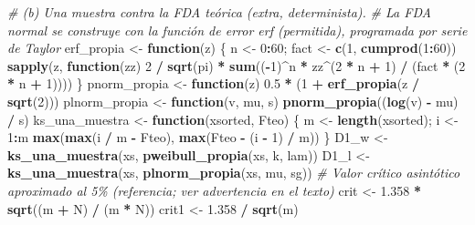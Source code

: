\documentclass[
  spanish,
]{article}
\newenvironment{Shaded}{\begin{snugshade}}{\end{snugshade}}
\newcommand{\CommentTok}[1]{\textcolor[rgb]{0.56,0.35,0.01}{\textit{#1}}}
\newcommand{\ControlFlowTok}[1]{\textcolor[rgb]{0.13,0.29,0.53}{\textbf{#1}}}
\newcommand{\DecValTok}[1]{\textcolor[rgb]{0.00,0.00,0.81}{#1}}
\newcommand{\FloatTok}[1]{\textcolor[rgb]{0.00,0.00,0.81}{#1}}
\newcommand{\FunctionTok}[1]{\textcolor[rgb]{0.13,0.29,0.53}{\textbf{#1}}}
\newcommand{\NormalTok}[1]{#1}
\newcommand{\OtherTok}[1]{\textcolor[rgb]{0.56,0.35,0.01}{#1}}
\newcommand{\SpecialCharTok}[1]{\textcolor[rgb]{0.81,0.36,0.00}{\textbf{#1}}}
\begin{document}
\begin{Shaded}
\begin{Highlighting}[]
\CommentTok{\# (b) Una muestra contra la FDA teórica (extra, determinista).}
\CommentTok{\#     La FDA normal se construye con la función de error erf (permitida), programada por serie de Taylor}
\NormalTok{erf\_propia }\OtherTok{\textless{}{-}} \ControlFlowTok{function}\NormalTok{(z) \{}
\NormalTok{  n }\OtherTok{\textless{}{-}} \DecValTok{0}\SpecialCharTok{:}\DecValTok{60}\NormalTok{; fact }\OtherTok{\textless{}{-}} \FunctionTok{c}\NormalTok{(}\DecValTok{1}\NormalTok{, }\FunctionTok{cumprod}\NormalTok{(}\DecValTok{1}\SpecialCharTok{:}\DecValTok{60}\NormalTok{))}
  \FunctionTok{sapply}\NormalTok{(z, }\ControlFlowTok{function}\NormalTok{(zz) }\DecValTok{2} \SpecialCharTok{/} \FunctionTok{sqrt}\NormalTok{(pi) }\SpecialCharTok{*} \FunctionTok{sum}\NormalTok{((}\SpecialCharTok{{-}}\DecValTok{1}\NormalTok{)}\SpecialCharTok{\^{}}\NormalTok{n }\SpecialCharTok{*}\NormalTok{ zz}\SpecialCharTok{\^{}}\NormalTok{(}\DecValTok{2} \SpecialCharTok{*}\NormalTok{ n }\SpecialCharTok{+} \DecValTok{1}\NormalTok{) }\SpecialCharTok{/}\NormalTok{ (fact }\SpecialCharTok{*}\NormalTok{ (}\DecValTok{2} \SpecialCharTok{*}\NormalTok{ n }\SpecialCharTok{+} \DecValTok{1}\NormalTok{))))}
\NormalTok{\}}
\NormalTok{pnorm\_propia  }\OtherTok{\textless{}{-}} \ControlFlowTok{function}\NormalTok{(z) }\FloatTok{0.5} \SpecialCharTok{*}\NormalTok{ (}\DecValTok{1} \SpecialCharTok{+} \FunctionTok{erf\_propia}\NormalTok{(z }\SpecialCharTok{/} \FunctionTok{sqrt}\NormalTok{(}\DecValTok{2}\NormalTok{)))}
\NormalTok{plnorm\_propia }\OtherTok{\textless{}{-}} \ControlFlowTok{function}\NormalTok{(v, mu, s) }\FunctionTok{pnorm\_propia}\NormalTok{((}\FunctionTok{log}\NormalTok{(v) }\SpecialCharTok{{-}}\NormalTok{ mu) }\SpecialCharTok{/}\NormalTok{ s)}
\NormalTok{ks\_una\_muestra }\OtherTok{\textless{}{-}} \ControlFlowTok{function}\NormalTok{(xsorted, Fteo) \{}
\NormalTok{  m }\OtherTok{\textless{}{-}} \FunctionTok{length}\NormalTok{(xsorted); i }\OtherTok{\textless{}{-}} \DecValTok{1}\SpecialCharTok{:}\NormalTok{m}
  \FunctionTok{max}\NormalTok{(}\FunctionTok{max}\NormalTok{(i }\SpecialCharTok{/}\NormalTok{ m }\SpecialCharTok{{-}}\NormalTok{ Fteo), }\FunctionTok{max}\NormalTok{(Fteo }\SpecialCharTok{{-}}\NormalTok{ (i }\SpecialCharTok{{-}} \DecValTok{1}\NormalTok{) }\SpecialCharTok{/}\NormalTok{ m))}
\NormalTok{\}}
\NormalTok{D1\_w }\OtherTok{\textless{}{-}} \FunctionTok{ks\_una\_muestra}\NormalTok{(xs, }\FunctionTok{pweibull\_propia}\NormalTok{(xs, k, lam))}
\NormalTok{D1\_l }\OtherTok{\textless{}{-}} \FunctionTok{ks\_una\_muestra}\NormalTok{(xs, }\FunctionTok{plnorm\_propia}\NormalTok{(xs, mu, sg))}
\CommentTok{\# Valor crítico asintótico aproximado al 5\% (referencia; ver advertencia en el texto)}
\NormalTok{crit }\OtherTok{\textless{}{-}} \FloatTok{1.358} \SpecialCharTok{*} \FunctionTok{sqrt}\NormalTok{((m }\SpecialCharTok{+}\NormalTok{ N) }\SpecialCharTok{/}\NormalTok{ (m }\SpecialCharTok{*}\NormalTok{ N))}
\NormalTok{crit1 }\OtherTok{\textless{}{-}} \FloatTok{1.358} \SpecialCharTok{/} \FunctionTok{sqrt}\NormalTok{(m)}


\end{Highlighting}
\end{Shaded}
\end{document}
